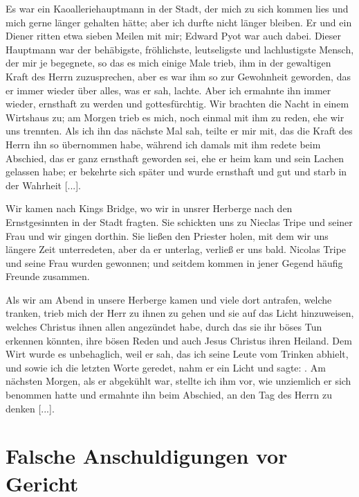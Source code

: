 Es war ein Kaoalleriehauptmann in der Stadt, der mich zu sich
kommen lies und mich gerne länger gehalten hätte; aber ich
durfte nicht länger bleiben. Er und ein Diener ritten etwa
sieben Meilen mit mir; Edward Pyot war 
auch dabei. Dieser
Hauptmann war der behäbigste, fröhlichste, leutseligste und 
lachlustigste Mensch, der mir je 
begegnete, so das es mich einige Male
trieb, ihm in der gewaltigen Kraft des Herrn zuzusprechen, aber
es war ihm so zur Gewohnheit geworden, das er immer wieder
über alles, was er sah, lachte. Aber ich ermahnte ihn immer
wieder, ernsthaft zu werden und gottesfürchtig. Wir brachten die
Nacht in einem Wirtshaus zu; am Morgen trieb es mich, noch
einmal mit ihm zu reden, ehe wir uns trennten. Als ich ihn
das nächste Mal sah, teilte er mir mit, das die Kraft des Herrn
ihn so übernommen habe, während ich damals mit ihm redete
beim Abschied, das er ganz ernsthaft geworden sei, ehe er heim
kam und sein Lachen gelassen habe; er bekehrte sich später und
wurde ernsthaft und gut und starb in der Wahrheit [...].


Wir kamen nach Kings Bridge, wo wir in unsrer Herberge
nach den Ernstgesinnten in der Stadt fragten. Sie schickten uns
zu Nieclas Tripe und seiner Frau und wir 
gingen dorthin. Sie
ließen den Priester holen, mit dem wir uns längere Zeit unterredeten,
aber da er unterlag, verließ er uns bald. Nicolas 
Tripe und
seine Frau wurden gewonnen; und seitdem kommen in jener Gegend
häufig Freunde zusammen. 


Als wir am Abend in unsere
Herberge kamen und viele dort antrafen, welche 
tranken, trieb 
mich der Herr zu ihnen zu gehen und sie auf das Licht 
hinzuweisen, welches Christus ihnen allen angezündet habe, durch das 
sie ihr böses Tun erkennen könnten, ihre bösen Reden und auch
Jesus Christus ihren Heiland. Dem Wirt wurde es unbehaglich,
weil er sah, das ich seine Leute vom Trinken abhielt, und sowie
ich die letzten Worte geredet, nahm er ein Licht und 
sagte: . Am
nächsten Morgen, als er abgekühlt war, stellte ich ihm vor, wie
unziemlich er sich benommen hatte und ermahnte ihn beim Abschied,
an den Tag des Herrn zu denken [...]. 

\section{Falsche Anschuldigungen vor Gericht}

